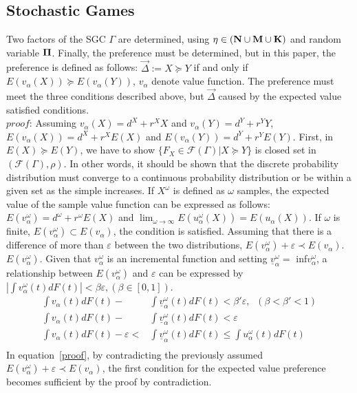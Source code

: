 \documentclass[journal]{IEEEtran} %
\begin{document}
\subsection{Stochastic Games}
Two factors of the SGC $\Gamma$ are determined, using $\eta \in (\bf{N} \cup \bf{M} \cup \bf{K})$ and random variable $\bf{\Pi}$. Finally, the preference must be determined, but in this paper, the preference is defined as follows: $\vec \Delta := X \succeq Y$ if and only if $E(v_{\alpha}(X)) \succeq E(v_{\alpha}(Y))$, $v_{\alpha}$ denote value function. The preference must meet the three conditions described above, but $\vec \Delta$ caused by the expected value satisfied conditions.\\
$proof$: Assuming $v_{\alpha}(X) = d^{X} + r^{X}X$ and $v_{\alpha}(Y) = d^{Y} + r^{Y}Y$, $E(v_{\alpha}(X)) = d^{X}+r^{X}E(X)$ and $E(v_{\alpha}(Y)) = d^{Y}+r^{Y}E(Y)$. First, in $E(X) \succeq E(Y)$, we have to show $\lbrace{F_{X} \in \mathcal{F}(\Gamma)|X \succeq Y}\rbrace$ is closed set in $(\mathcal{F}(\Gamma),\rho)$. In other words, it should be shown that the discrete probability distribution must converge to a continuous probability distribution or be within a given  set as the simple increases. If $X^{\omega}$ is defined as $\omega$ samples, the expected value of the sample value function can be expressed as follows: $E(v_{\alpha}^{\omega})={d^\omega } + {r^\omega }E(X)$ and ${\lim _{\omega  \to \infty }}E(u_\alpha ^\omega (X)) = E({u_\alpha }(X))$. If $\omega$ is finite, $E(v_{\alpha}^{\omega}) \subset E(v_{\alpha})$, the condition is satisfied. Assuming that there is a difference of more than $\varepsilon$ between the two distributions, $E(v_{\alpha}^{\omega}) + \varepsilon \prec E(v_{\alpha})$. $E(v_{\alpha}^{\omega})$. Given that $v_{\alpha}^{\omega}$ is an incremental function and setting $\underline{v}_{\alpha}^{\omega} =$ inf$v_{\alpha}^{\omega}$, a relationship between $E(v_{\alpha}^{\omega})$ and $\varepsilon$ can be expressed by $\left| {\int {v_\alpha ^\omega } (t)dF(t)} \right| < \beta \varepsilon, (\beta \in [0,1])$.
\begin{equation}
\label{proof}
\begin{aligned}
\int {{v_\alpha }} (t)dF(t) - &\int {\underline{v}_\alpha ^\omega (t)dF(t)}  < \beta '\varepsilon,\;\; (\beta < \beta ' < 1)\\
\int {{v_\alpha }} (t)dF(t) - &\int {\underline{v}_\alpha ^\omega (t)dF(t)}  < \varepsilon\\
\int {{v_\alpha }} (t)dF(t) - \varepsilon < &\int {\underline{v}_\alpha ^\omega (t)dF(t)}  \leq \int {{u_{\alpha}^{\omega}}} (t)dF(t)\\
\end{aligned}
\end{equation}
In equation~\ref{proof}, by contradicting the previously assumed $E(v_{\alpha}^{\omega}) + \varepsilon \prec E(v_{\alpha})$, the first condition for the expected value preference becomes sufficient by the proof by contradiction.
\end{document}
